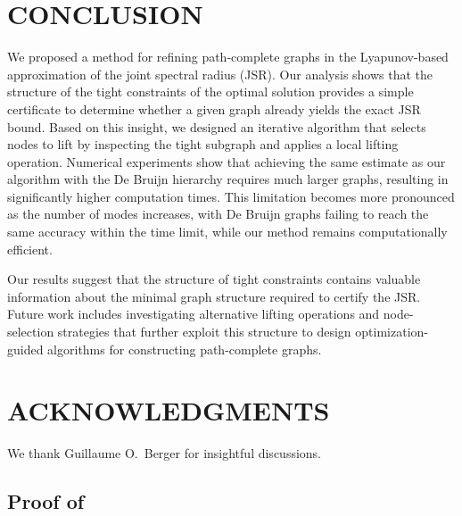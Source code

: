 \documentclass[letterpaper, 10 pt, conference]{ieeeconf}  %
\newif\ifextended
\begin{document}
\section{CONCLUSION}
We proposed a method for refining path-complete graphs in the
Lyapunov-based approximation of the joint spectral radius (JSR).
Our analysis shows that the structure of the tight constraints of the
optimal solution provides a simple certificate to determine whether a
given graph already yields the exact JSR bound. Based on this insight,
we designed an iterative algorithm that selects nodes to lift by
inspecting the tight subgraph and applies a local lifting operation. Numerical experiments show that achieving the same estimate as our algorithm with the De Bruijn hierarchy requires much larger graphs, resulting in significantly higher computation times. This limitation becomes more pronounced as the number of modes increases, with De Bruijn graphs failing to reach the same accuracy within the time limit, while our method remains computationally efficient.

Our results suggest that the structure of tight constraints contains
valuable information about the minimal graph structure required to
certify the JSR. Future work includes investigating alternative lifting
operations and node-selection strategies that further exploit this
structure to design optimization-guided algorithms for constructing
path-complete graphs.
\section{ACKNOWLEDGMENTS}
We thank Guillaume O.~Berger for insightful discussions.



\ifextended
\appendix
\subsection{Proof of } \label{appendix:proof_equality_tight}
\end{document}
